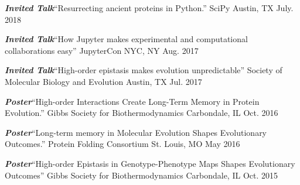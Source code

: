 
\begin{cvpresentations}


  \cvpresentation
    {\textbf{\textit{Invited Talk}}{\enskip\cdotp\enskip}``Resurrecting ancient proteins in Python.''} %
    {SciPy} %
    {Austin, TX} %
    {July. 2018} %

  \cvpresentation
    {\textbf{\textit{Invited Talk}}{\enskip\cdotp\enskip}``How Jupyter makes experimental and computational collaborations easy''} %
    {JupyterCon} %
    {NYC, NY} %
    {Aug. 2017} %

  \cvpresentation
    {\textbf{\textit{Invited Talk}}{\enskip\cdotp\enskip}``High-order epistasis makes evolution unpredictable''} %
    {Society of Molecular Biology and Evolution} %
    {Austin, TX} %
    {Jul. 2017} %

  \cvpresentation
    {\textbf{\textit{Poster}}{\enskip\cdotp\enskip}``High-order Interactions Create Long-Term Memory in Protein Evolution.''} %
    {Gibbs Society for Biothermodynamics} %
    {Carbondale, IL} %
    {Oct. 2016} %

  \cvpresentation
    {\textbf{\textit{Poster}}{\enskip\cdotp\enskip}``Long-term memory in Molecular Evolution Shapes Evolutionary Outcomes.''} %
    {Protein Folding Consortium} %
    {St. Louis, MO} %
    {May 2016} %

  \cvpresentation
    {\textbf{\textit{Poster}}{\enskip\cdotp\enskip}``High-order Epistasis in Genotype-Phenotype Maps Shapes Evolutionary Outcomes''} %
    {Gibbs Society for Biothermodynamics} %
    {Carbondale, IL} %
    {Oct. 2015} %


\end{cvpresentations}

